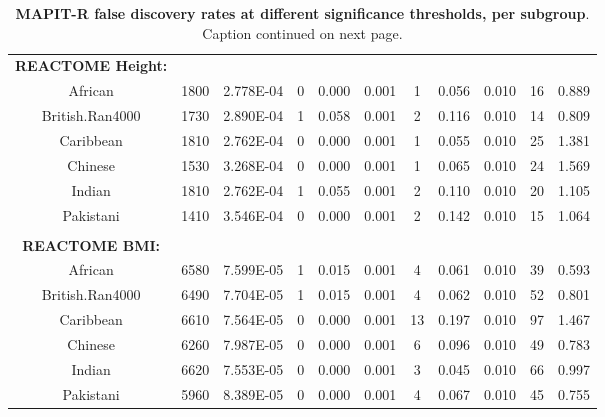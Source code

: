 \documentclass[12pt,a4paper]{article}
\begin{document}
\begin{landscape}
\begin{table}[ht]
\begin{tabular}{ccccccccccc}
  \textbf{REACTOME Height:} & & & & & & & & & \\
  African & 1800 & 2.778E-04 & 0 & 0.000 & 0.001 & 1 & 0.056 & 0.010 & 16 & 0.889 \\
  British.Ran4000 & 1730 & 2.890E-04 & 1 & 0.058 & 0.001 & 2 & 0.116 & 0.010 & 14 & 0.809 \\
  Caribbean & 1810 & 2.762E-04 & 0 & 0.000 & 0.001 & 1 & 0.055 & 0.010 & 25 & 1.381 \\
  Chinese & 1530 & 3.268E-04 & 0 & 0.000 & 0.001 & 1 & 0.065 & 0.010 & 24 & 1.569 \\
  Indian & 1810 & 2.762E-04 & 1 & 0.055 & 0.001 & 2 & 0.110 & 0.010 & 20 & 1.105 \\
  Pakistani & 1410 & 3.546E-04 & 0 & 0.000 & 0.001 & 2 & 0.142 & 0.010 & 15 & 1.064 \\
  \\
  \textbf{REACTOME BMI:} & & & & & & & & & \\
African & 6580 & 7.599E-05 & 1 & 0.015 & 0.001 & 4 & 0.061 & 0.010 & 39 & 0.593 \\
  British.Ran4000 & 6490 & 7.704E-05 & 1 & 0.015 & 0.001 & 4 & 0.062 & 0.010 & 52 & 0.801 \\
  Caribbean & 6610 & 7.564E-05 & 0 & 0.000 & 0.001 & 13 & 0.197 & 0.010 & 97 & 1.467 \\
  Chinese & 6260 & 7.987E-05 & 0 & 0.000 & 0.001 & 6 & 0.096 & 0.010 & 49 & 0.783 \\
  Indian & 6620 & 7.553E-05 & 0 & 0.000 & 0.001 & 3 & 0.045 & 0.010 & 66 & 0.997 \\
  Pakistani & 5960 & 8.389E-05 & 0 & 0.000 & 0.001 & 4 & 0.067 & 0.010 & 45 & 0.755 \\
   \hline
\end{tabular}
\caption[TBD]{\textbf{MAPIT-R false discovery rates at different significance thresholds, per subgroup}. Caption continued on next page. }
\label{InterPath-Supp-Tables-AllPops-FDRs}
\end{table}
\end{landscape}
\clearpage
\setlength{\footskip}{1cm}
\end{document}

